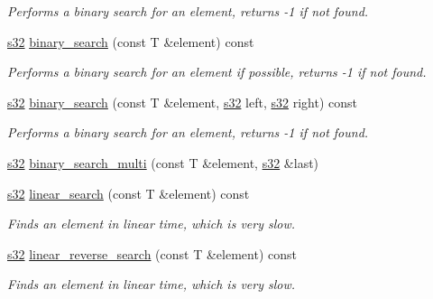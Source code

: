 \begin{DoxyCompactItemize}
\begin{DoxyCompactList}\small\item\em Performs a binary search for an element, returns -\/1 if not found. \end{DoxyCompactList}\item 
\hyperlink{namespaceirr_ac66849b7a6ed16e30ebede579f9b47c6}{s32} \hyperlink{classirr_1_1core_1_1array_af9cd0644165ab0d40f97799acd3f2c22}{binary\+\_\+search} (const T \&element) const 
\begin{DoxyCompactList}\small\item\em Performs a binary search for an element if possible, returns -\/1 if not found. \end{DoxyCompactList}\item 
\hyperlink{namespaceirr_ac66849b7a6ed16e30ebede579f9b47c6}{s32} \hyperlink{classirr_1_1core_1_1array_ae2f68111b6899a63454d2956ee58ba6c}{binary\+\_\+search} (const T \&element, \hyperlink{namespaceirr_ac66849b7a6ed16e30ebede579f9b47c6}{s32} left, \hyperlink{namespaceirr_ac66849b7a6ed16e30ebede579f9b47c6}{s32} right) const 
\begin{DoxyCompactList}\small\item\em Performs a binary search for an element, returns -\/1 if not found. \end{DoxyCompactList}\item 
\hyperlink{namespaceirr_ac66849b7a6ed16e30ebede579f9b47c6}{s32} \hyperlink{classirr_1_1core_1_1array_a62821cac92125dd76f96f21e60ca94a4}{binary\+\_\+search\+\_\+multi} (const T \&element, \hyperlink{namespaceirr_ac66849b7a6ed16e30ebede579f9b47c6}{s32} \&last)
\item 
\hyperlink{namespaceirr_ac66849b7a6ed16e30ebede579f9b47c6}{s32} \hyperlink{classirr_1_1core_1_1array_a06327f3b1a87117a57a617cbb7738beb}{linear\+\_\+search} (const T \&element) const 
\begin{DoxyCompactList}\small\item\em Finds an element in linear time, which is very slow. \end{DoxyCompactList}\item 
\hyperlink{namespaceirr_ac66849b7a6ed16e30ebede579f9b47c6}{s32} \hyperlink{classirr_1_1core_1_1array_ac4a756f807ae06a74cc71cfd05dc22de}{linear\+\_\+reverse\+\_\+search} (const T \&element) const 
\begin{DoxyCompactList}\small\item\em Finds an element in linear time, which is very slow. \end{DoxyCompactList}\item 

\end{DoxyCompactItemize}
